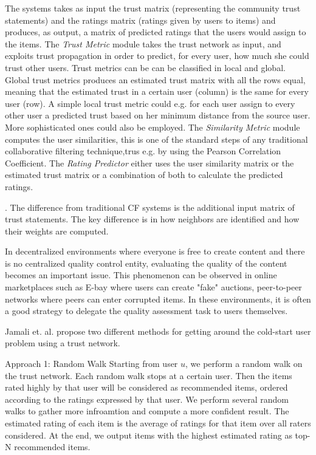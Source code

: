 The systems takes as input the trust matrix (representing the community trust statements) and the ratings matrix (ratings given by users to items) and produces, as output, a matrix of predicted ratings that the users would assign to the items. The \emph{Trust Metric} module takes the trust network as input, and exploits trust propagation in order to predict, for every user, how much she could trust other users. Trust metrics can be can be classified in local and global. Global trust metrics produces an estimated trust matrix with all the rows equal, meaning that the estimated trust in a certain user (column) is the same for every user (row). A simple local trust metric could e.g. for each user assign to every other user a predicted trust based on her minimum distance from the source user. More sophisticated ones could also be employed. The \emph{Similarity Metric} module computes the user similarities, this is one of the standard steps of any traditional collaborative filtering technique,trus e.g. by using the Pearson Correlation Coefficient. The \emph{Rating Predictor} either uses the user similarity matrix or the estimated trust matrix or a combination of both to calculate the predicted ratings.

. The difference from traditional CF systems is the additional input matrix of trust statements. The key difference is in how neighbors are identified and how their weights are computed.

In decentralized environments where everyone is free to create content and there is no centralized quality control entity, evaluating the quality of the content becomes an important issue. This phenomenon can be observed in online marketplaces such as E-bay where users can create "fake" auctions, peer-to-peer networks where peers can enter corrupted items. In these environments, it is often a good strategy to delegate the quality assessment task to users themselves.


Jamali et. al. \cite{Jamali2009} propose two different methods for getting around the cold-start user problem using a trust network.

Approach 1: Random Walk
Starting from user $u$, we perform a random walk on the trust network. Each random walk stops at a certain user. Then the items rated highly by that user will be considered as recommended items, ordered according to the ratings expressed by that user. We perform several random walks to gather more infroamtion and compute a more confident result. The estimated rating of each item is the average of ratings for that item over all raters considered. At the end, we output items with the highest estimated rating as top-N recommended items.

